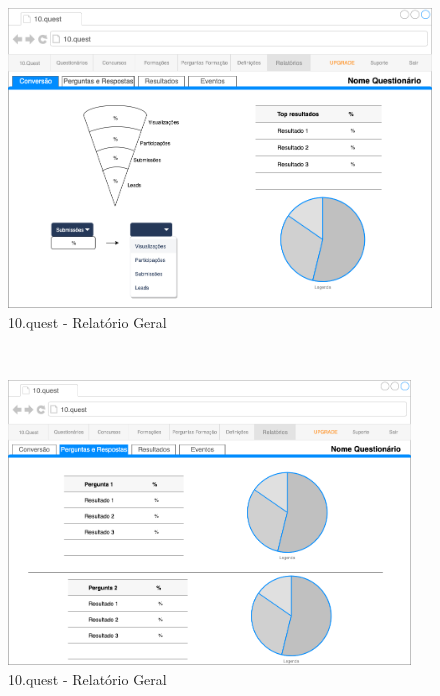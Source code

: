 \begin{figure}[ht!]
	\begin{center}
		\includegraphics[width=1\textwidth]{img/prototipos/r1.png}
		\caption{10.quest - Relatório Geral}
		\label{10q-r1}
	\end{center}
\end{figure}
\mbox{ }
\newpage
\begin{figure}[ht!]
	\begin{center}
		\includegraphics[width=0.95\textwidth]{img/prototipos/r2.png}
		\caption{10.quest - Relatório Geral}
		\label{10q-r2}
	\end{center}
\end{figure}
\newpage
\mbox{ }
